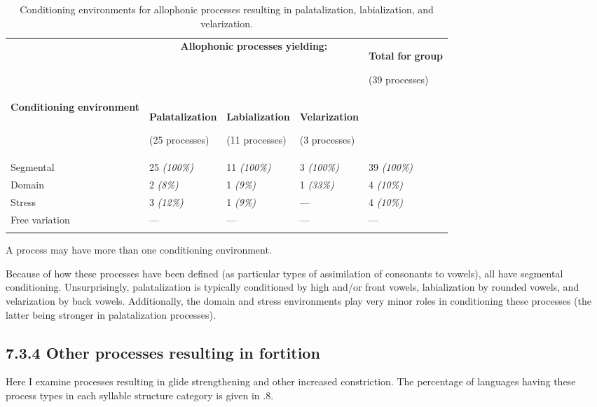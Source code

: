 \begin{table}
\begin{tabularx}{\textwidth}{XXXXX}
\lsptoprule
 & \multicolumn{3}{c}{ \textbf{Allophonic} \textbf{processes} \textbf{yielding:}} & { \textbf{Total} \textbf{for} \textbf{group}}

 (39 processes)\\
 \textbf{Conditioning} \textbf{environment} & { \textbf{Palatalization}}

 (25 processes) & { \textbf{Labialization}}

 (11 processes) & { \textbf{Velarization}}

 (3 processes) & \\
 Segmental & 25 \textit{(100\%)} & 11 \textit{(100\%)} & 3 \textit{(100\%)} & 39 \textit{(100\%)}\\
 Domain & 2 \textit{(8\%)} & 1 \textit{(9\%)} & 1 \textit{(33\%)} & 4 \textit{(10\%)}\\
 Stress & 3 \textit{(12\%)} & 1 \textit{(9\%)} & — & 4 \textit{(10\%)}\\
 Free variation & — & — & — & —\\
\lspbottomrule
\end{tabularx}
\caption{\label{7.3}Conditioning environments for allophonic processes resulting in palatalization, labialization, and velarization.}A process may have more than one conditioning environment.
\end{table}




  Because of how these processes have been defined (as particular types of assimilation of consonants to vowels), all have segmental conditioning. Unsurprisingly, palatalization is typically conditioned by high and/or front vowels, labialization by rounded vowels, and velarization by back vowels. Additionally, the domain and stress environments play very minor roles in conditioning these processes (the latter being stronger in palatalization processes).


\subsection{7.3.4 Other processes resulting in fortition}

  Here I examine processes resulting in glide strengthening and other increased constriction. The percentage of languages having these process types in each syllable structure category is given in .8.






